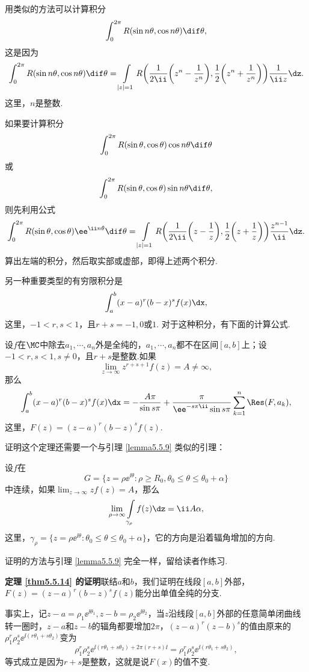用类似的方法可以计算积分
\[\int_0^{2\pi}R(\sin n\theta,\cos n\theta)\dif \theta,\]
这是因为
\[\int_0^{2\pi}R(\sin n\theta,\cos n\theta)\dif \theta=
\int\limits_{|z|=1}R\bigg(\frac1{2\ii}\bigg(z^n-\frac1{z^n}\bigg),
\frac12\bigg(z^n+\frac1{z^n}\bigg)\bigg)\frac1{\ii z}\dz.\]
这里，$n$是整数.

如果要计算积分
\[\int_0^{2\pi}R(\sin \theta,\cos \theta)\cos n\theta\dif \theta\]
或
\[\int_0^{2\pi}R(\sin \theta,\cos \theta)\sin n\theta\dif \theta,\]
则先利用公式
\begin{equation}\label{eq5.5.10}
\int_0^{2\pi}R(\sin\theta,\cos\theta)\ee^{\ii n\theta}\dif \theta=
\int\limits_{|z|=1}R\bigg(\frac1{2\ii}\bigg(z-\frac1z\bigg),
\frac12\bigg(z+\frac1z\bigg)\bigg)\frac{z^{n-1}}{\ii}\dz.
\end{equation}
算出左端的积分，然后取实部或虚部，即得上述两个积分.

另一种重要类型的有穷限积分是
\[\int_a^b(x-a)^r(b-x)^sf(x)\dx,\]
这里，$-1<r,s<1$，且$r+s=-1,0$或$1$. 对于这种积分，有下面的计算公式.

\begin{theorem}\label{thm5.5.14}
设$f$在$\MC$中除去$a_1,\cdots,a_n$外是全纯的，$a_1,\cdots,a_n$都不在区间$[a,b]$上；设$-1<r,s<1,s\ne0$，且$r+s$是整数.如果
\[\lim_{z\to\infty}z^{r+s+1}f(z)=A\ne\infty,\]
那么
\begin{equation}\label{eq5.5.11}
\int_a^b(x-a)^r(b-x)^sf(x)\dx=-\frac{A\pi}{\sin s\pi}+\frac\pi{\ee^{-s\pi\ii}\sin
s\pi}\sum_{k=1}^n\Res(F,a_k),
\end{equation}
这里，$F(z)=(z-a)^r(b-z)^sf(z)$.
\end{theorem}

证明这个定理还需要一个与引理 \ref{lemma5.5.9} 类似的引理：
\begin{lemma}\label{lemma5.5.15}
设$f$在
\[G=\{z=\rho\ee^{\ii\theta}:\rho\ge R_0,\theta_0\le\theta\le\theta_0+\alpha\}\]
中连续，如果$\lim_{z\to\infty}zf(z)=A$，那么
\[\lim_{\rho\to\infty}\int\limits_{\gamma_\rho}f(z)\dz=\ii A\alpha,\]
这里，$\gamma_\rho=\{z=\rho\ee^{\ii\theta}:\theta_0\le\theta\le\theta_0+\alpha\}$，它的方向是沿着辐角增加的方向.

证明的方法与引理 \ref{lemma5.5.9} 完全一样，留给读者作练习.
\end{lemma}

\textbf{定理 \ref{thm5.5.14} 的证明}\quad 联结$a$和$b$，我们证明在线段$[a,b]$外部，$F(z)=(z-a)^r(b-z)^sf(z)$能分出单值全纯的分支.

事实上，记$z-a=\rho_1\ee^{\ii\theta_1},z-b=\rho_2\ee^{\ii\theta_2}$，当$z$沿线段$[a,b]$外部的任意简单闭曲线转一圈时，$z-a$和$z-b$的辐角都要增加$2\pi$，$(z-a)^r(z-b)^s$的值由原来的$\rho_1^r\rho_2^s\ee^{\ii(r\theta_1+s\theta_2)}$变为
\[\rho_1^r\rho_2^s\ee^{\ii(r\theta_1+s\theta_2)+2\pi(r+s)\ii}=
\rho_1^r\rho_2^s\ee^{\ii(r\theta_1+s\theta_2)},\]
等式成立是因为$r+s$是整数，这就是说$F(x)$的值不变.

